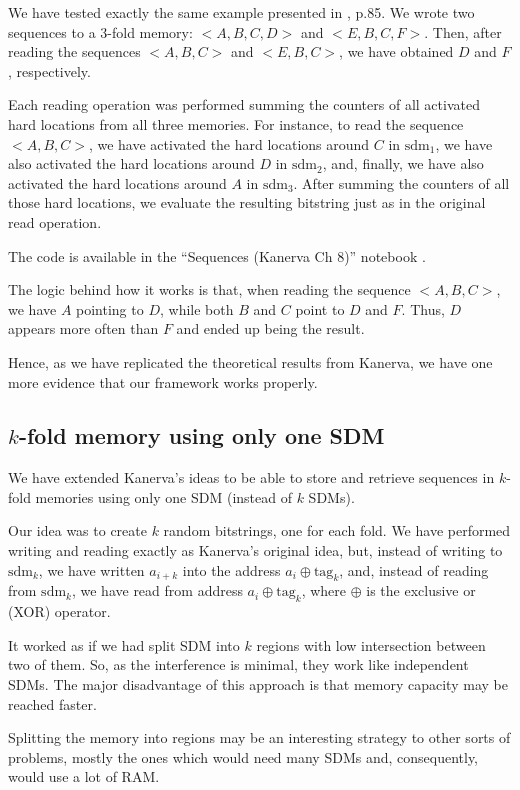 We have tested exactly the same example presented in \citet{Kanerva1988}, p.85. We wrote two sequences to a $3$-fold memory: $<A, B, C, D>$ and $<E, B, C, F>$. Then, after reading the sequences $<A, B, C>$ and $<E, B, C>$, we have obtained $D$ and $F$, respectively.

Each reading operation was performed summing the counters of all activated hard locations from all three memories. For instance, to read the sequence $<A, B, C>$, we have activated the hard locations around $C$ in $\text{sdm}_1$, we have also activated the hard locations around $D$ in $\text{sdm}_2$, and, finally, we have also activated the hard locations around $A$ in $\text{sdm}_3$. After summing the counters of all those hard locations, we evaluate the resulting bitstring just as in the original read operation.

The code is available in the ``Sequences (Kanerva Ch 8)'' notebook \citep{sdmframework}.

The logic behind how it works is that, when reading the sequence $<A, B, C>$, we have $A$ pointing to $D$, while both $B$ and $C$ point to $D$ and $F$. Thus, $D$ appears more often than $F$ and ended up being the result.

Hence, as we have replicated the theoretical results from Kanerva, we have one more evidence that our framework works properly.

\subsection{$k$-fold memory using only one SDM}

We have extended Kanerva's ideas to be able to store and retrieve sequences in $k$-fold memories using only one SDM (instead of $k$ SDMs).

Our idea was to create $k$ random bitstrings, one for each fold. We have performed writing and reading exactly as Kanerva's original idea, but, instead of writing to $\text{sdm}_k$, we have written $a_{i+k}$ into the address $a_i \oplus \text{tag}_k$, and, instead of reading from $\text{sdm}_k$, we have read from address $a_i \oplus \text{tag}_k$, where $\oplus$ is the exclusive or (XOR) operator.

It worked as if we had split SDM into $k$ regions with low intersection between two of them. So, as the interference is minimal, they work like independent SDMs. The major disadvantage of this approach is that memory capacity may be reached faster.

Splitting the memory into regions may be an interesting strategy to other sorts of problems, mostly the ones which would need many SDMs and, consequently, would use a lot of RAM.
